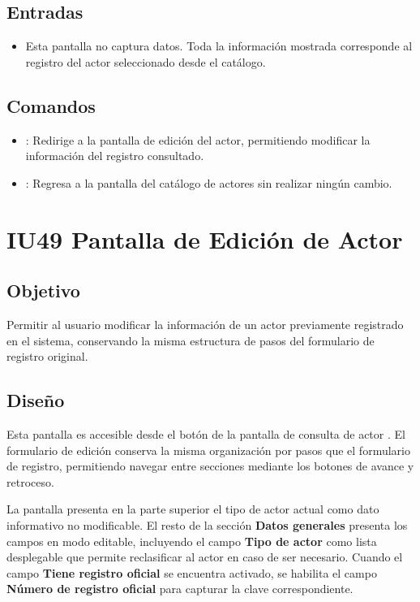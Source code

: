 \subsection{Entradas}
\begin{itemize}
	\item Esta pantalla no captura datos. Toda la información mostrada 
	corresponde al registro del actor seleccionado desde el catálogo.
\end{itemize}

\subsection{Comandos}
\begin{itemize}
	\item {}: Redirige a la pantalla de edición del actor, 
	permitiendo modificar la información del registro consultado.
	\item {}: Regresa a la pantalla del catálogo de actores 
	 sin 
	realizar ningún cambio.
\end{itemize}

\section{IU49 Pantalla de Edición de Actor}
\subsection{Objetivo}
Permitir al usuario modificar la información de un actor previamente registrado 
en el sistema, conservando la misma estructura de pasos del formulario de 
registro original.

\subsection{Diseño}
Esta pantalla  es accesible desde el 
botón  de la pantalla de consulta de actor 
. El formulario de edición conserva 
la misma organización por pasos que el formulario de registro, permitiendo 
navegar entre secciones mediante los botones de avance y retroceso.

La pantalla presenta en la parte superior el tipo de actor actual como dato 
informativo no modificable. El resto de la sección \textbf{Datos generales} 
presenta los campos en modo editable, incluyendo el campo \textbf{Tipo de 
	actor} como lista desplegable que permite reclasificar al actor en caso de ser 
necesario. Cuando el campo \textbf{Tiene registro oficial} se encuentra 
activado, se habilita el campo \textbf{Número de registro oficial} para capturar 
la clave correspondiente.

